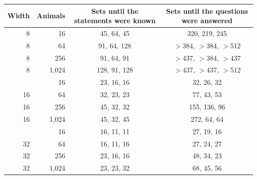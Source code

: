 \begin{tabular}{@{}rrcc@{}}
\toprule
Width & Animals & Sets until the statements were known & Sets until the questions were answered \\
\midrule
8 & 16 & 45, 64, 45 & 320, 219, 245 \\
8 & 64 & 91, 64, 128 & $>$384, $>$384, $>$512 \\
8 & 256 & 91, 64, 91 & $>$437, $>$384, $>$437 \\
8 & 1{,}024 & 128, 91, 128 & $>$437, $>$437, $>$512 \\
\addlinespace[3pt]
16 & 16 & 23, 16, 16 & 32, 26, 32 \\
16 & 64 & 32, 23, 23 & 77, 43, 53 \\
16 & 256 & 45, 32, 32 & 155, 136, 96 \\
16 & 1{,}024 & 45, 32, 45 & 272, 64, 64 \\
\addlinespace[3pt]
32 & 16 & 16, 11, 11 & 27, 19, 16 \\
32 & 64 & 16, 11, 16 & 27, 24, 27 \\
32 & 256 & 23, 16, 16 & 48, 34, 23 \\
32 & 1{,}024 & 23, 23, 32 & 68, 45, 56 \\
\bottomrule
\end{tabular}
